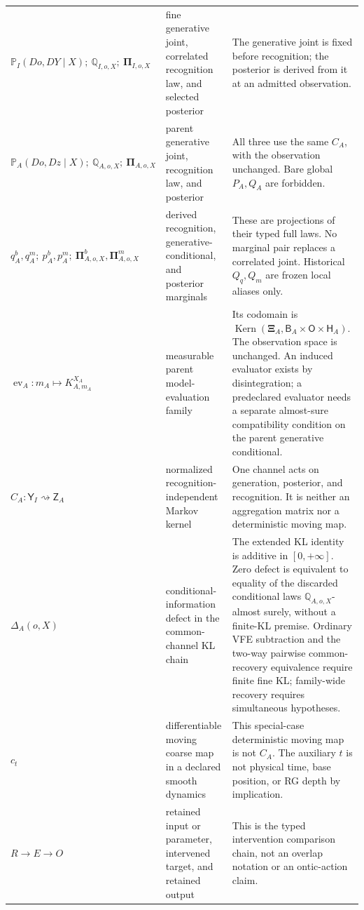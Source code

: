 \begin{longtable}{@{}>{\raggedright\arraybackslash}p{}
>{\raggedright\arraybackslash}p{}
>{\raggedright\arraybackslash}p{}@{}}
\(\mathbb P_I(Do,DY\mid X);\ \mathbb Q_{I,o,X};\
\boldsymbol\Pi_{I,o,X}\) &
fine generative joint, correlated recognition law, and selected posterior &
The generative joint is fixed before recognition; the posterior is derived
from it at an admitted observation. \\
\(\mathbb P_A(Do,Dz\mid X);\ \mathbb Q_{A,o,X};\
\boldsymbol\Pi_{A,o,X}\) &
parent generative joint, recognition law, and posterior &
All three use the same \(C_A\), with the observation unchanged. Bare global
\(P_A,Q_A\) are forbidden. \\
\(q_A^b,q_A^m;\ p_A^b,p_A^m;\
\boldsymbol\Pi_{A,o,X}^b,\boldsymbol\Pi_{A,o,X}^m\) &
derived recognition, generative-conditional, and posterior marginals &
These are projections of their typed full laws. No marginal pair replaces a
correlated joint. Historical \(Q_q,Q_m\) are frozen local aliases only. \\
\(\operatorname{ev}_A:m_A\mapsto K^{X_A}_{A,m_A}\) &
measurable parent model-evaluation family &
Its codomain is
\(\operatorname{Kern}(\boldsymbol\Xi_A,
\mathsf B_A\times\mathsf O\times\mathsf H_A)\). The observation space is
unchanged. An induced evaluator exists by disintegration; a predeclared evaluator needs a separate
almost-sure compatibility condition on the parent generative conditional. \\
\(C_A:\mathsf Y_I\rightsquigarrow\mathsf Z_A\) &
normalized recognition-independent Markov kernel &
One channel acts on generation, posterior, and recognition. It is neither an
aggregation matrix nor a deterministic moving map. \\
\(\Delta_A(o,X)\) &
conditional-information defect in the common-channel KL chain &
The extended KL identity is additive in \([0,+\infty]\). Zero defect is
equivalent to equality of the discarded conditional laws
\(\mathbb Q_{A,o,X}\)-almost surely, without a finite-KL premise. Ordinary VFE subtraction and
the two-way pairwise common-recovery equivalence require finite fine KL; family-wide recovery
requires simultaneous hypotheses. \\
\(c_t\) &
differentiable moving coarse map in a declared smooth dynamics &
This special-case deterministic moving map is not \(C_A\). The auxiliary \(t\) is not physical
time, base position, or RG depth by implication. \\
\(R\to E\to O\) &
retained input or parameter, intervened target, and retained output &
This is the typed intervention comparison chain, not an overlap notation or
an ontic-action claim. \\

\end{longtable}
